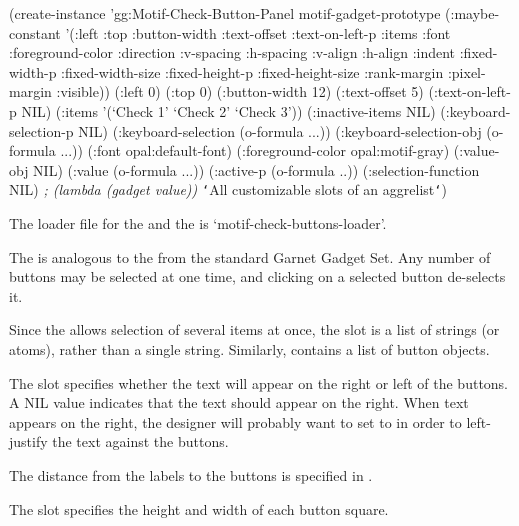 \begin{group}
\begin{programexample}
(create-instance 'gg:Motif-Check-Button-Panel motif-gadget-prototype
   (:maybe-constant '(:left :top :button-width :text-offset :text-on-left-p :items
                      :font :foreground-color :direction :v-spacing :h-spacing
                      :v-align :h-align :indent :fixed-width-p :fixed-width-size
                      :fixed-height-p :fixed-height-size :rank-margin :pixel-margin
                      :visible))
   (:left 0)
   (:top 0)
   (:button-width 12)
   (:text-offset 5)
   (:text-on-left-p NIL)
   (:items '(`Check 1' `Check 2' `Check 3'))
   (:inactive-items NIL)
   (:keyboard-selection-p NIL)
   (:keyboard-selection (o-formula ...))
   (:keyboard-selection-obj (o-formula ...))
   (:font opal:default-font)
   (:foreground-color opal:motif-gray)
   (:value-obj NIL)
   (:value (o-formula ...))
   (:active-p (o-formula ..))
   (:selection-function NIL)   {\it ; (lambda (gadget value))}
   {\tt\char`\<}All customizable slots of an aggrelist{\tt\char`\>})
\end{programexample}
\end{group}

The loader file for the  and the
 is `motif-check-buttons-loader'.

The  is analogous to the  from
the standard Garnet Gadget Set.  Any number of buttons may be selected at one
time, and clicking on a selected button de-selects it.

Since the  allows selection of several items at
once, the  slot is a list of strings (or atoms), rather than a
single string.  Similarly,  contains a list of button objects.

The slot  specifies whether the text will appear on the
right or left of the buttons.  A NIL value indicates that the text should
appear on the right.  When text appears on the right, the designer will
probably want to set  to  in order to left-justify the
text against the buttons.

The distance from the labels to the buttons is specified in .

The slot  specifies the height and width of each button
square.

